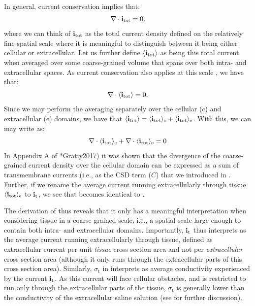 In general, current conservation implies that: 
\begin{equation}
{\bf \nabla} \cdot {\bf i}_\text{tot} = 0, 
\label{eq:Basics:Sergey1}
\end{equation}
where we can think of ${\bf i}_\text{tot}$ as the total current density defined on the relatively fine spatial scale where it is meaningful to distinguish between it being either cellular or extracellular. Let us further define $\left<{\bf i}_\text{tot}\right>$ as being this total current when averaged over some coarse-grained volume that spans over both intra- and extracellular spaces. 
As current conservation also applies at this scale , we have that: 
\begin{equation}
{\bf \nabla} \cdot \langle{\bf i}_\text{tot}\rangle = 0.
\label{eq:Basics:Sergey2}
\end{equation}
Since we may perform the averaging separately over the cellular (c)  and extracellular (e) domains, we have that $\langle{\bf i}_\text{tot}\rangle = \langle{\bf i}_\text{tot}\rangle_\text{c} + \langle{\bf i}_\text{tot}\rangle_\text{e}$. With this, we can may write  as:
\begin{equation}
{\bf \nabla} \cdot \langle{\bf i}_\text{tot}\rangle_\text{c}  + {\bf \nabla}\cdot \langle{\bf i}_\text{tot}\rangle_\text{e} = 0
\label{eq:Basics:Sergey3}
\end{equation}
In Appendix A of \citeasnoun**{Gratiy2017}) it was shown that the divergence of the coarse-grained current density over the cellular domain can be expressed as a sum of transmembrane currents (i.e., as the CSD term ($C$) that we introduced in . Further, if we rename the average current running extracellularly through tissue $\langle{\bf i}_\text{tot}\rangle_\text{e}$ to ${\bf i}_\text{t}$, we see that  becomes identical to  . 

The derivation of  thus reveals that it only has a meaningful interpretation when considering tissue in a coarse-grained scale, i.e., a spatial scale large enough to contain both intra- and extracellular domains.
Importantly, ${\bf i}_\text{t}$ thus interprets as the average current running extracellularly through tissue, defined as extracellular current per unit \textit{tissue} cross section area and not per \textit{extracellular} cross section area (although it only runs through the extracellular parts of this cross section area). Similarly, $\sigma_\text{t}$ in  interprets as average conductivity experienced by the current ${\bf i}_\text{t}$. As this current will face cellular obstacles, and is restricted to run only through the extracellular parts of the tissue, $\sigma_\text{t}$ is generally lower than the conductivity of the extracellular saline solution (see  for further discussion). 


